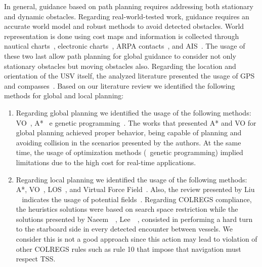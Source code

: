     
    
    In general, guidance based on path planning requires addressing both stationary and dynamic obstacles. Regarding real-world-tested work, guidance requires an accurate world model and robust methods to avoid detected obstacles. World representation is done using cost maps and information is collected through nautical charts~\cite{Larson2006Autonomous}, electronic charts~\cite{Naus2013Idea}, \ac{ARPA} contacts~\cite{Larson2006Autonomous}, and \ac{AIS}~\cite{Abdelaal2017NMPC}. The usage of these two last allow path planning for global guidance to consider not only stationary obstacles but moving obstacles also. Regarding the location and orientation of the \ac{USV} itself, the analyzed literature presented the usage of GPS~\cite{Benjamin2004COLREGS} and compasses~\cite{Annamalai2013Comparison}. Based on our literature review we identified the following methods for global and local planning:
    
    \begin{enumerate}
    
        \item Regarding global planning we identified the usage of the following methods: \ac{VO}~\cite{Larson2006Autonomous, Kuwata2014Safe, Zhuang2011Motion, Huang2019Generalized}, A*~\cite{Naeem2012COLREGS, Campbell2012Review_COLREGs, Naus2013Idea} e genetic programming~\cite{Svec2012Automated, Svec2011aAutomated}. The works that presented A* and VO for global planning achieved proper behavior, being capable of planning and avoiding collision in the scenarios presented by the authors. At the same time, the usage of optimization methods (\ie~genetic programming) implied limitations due to the high cost for real-time applications. 
        
        \item Regarding local planning we identified the usage of the following methods: A*\cite{Larson2006Autonomous, Campbell2013Automatic, Agrawal2015COLREGS}, \ac{VO}~\cite{Larson2006Autonomous, Huang2019Generalized}, \ac{LOS}~\cite{Naeem2012COLREGS}, and Virtual Force Field~\cite{Lee2004Fuzzy}. Also, the review presented by Liu \etal~\cite{Liu2016Unmanned} indicates the usage of potential fields~\cite{Healey2007Collaborative, Soltan2009Trajectory}. Regarding \ac{COLREGS} compliance, the heuristics solutions were based on search space restriction while the solutions presented by  Naeem~\etal~\cite{Naeem2012COLREGS}, Lee~\etal~\cite{Lee2004Fuzzy}, consisted in performing a hard turn to the starboard side in every detected encounter between vessels. We consider this is not a good approach since this action may lead to violation of other \ac{COLREGS} rules such as rule 10 that impose that navigation must respect \acf{TSS}.
        
    \end{enumerate}
    

